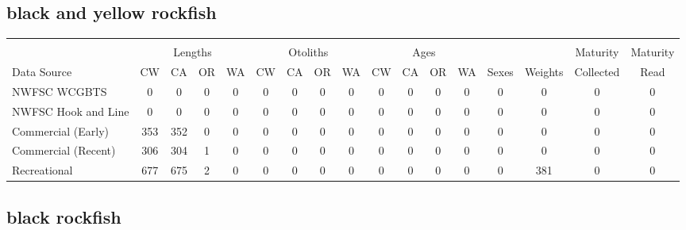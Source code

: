 \documentclass[12pt,]{article}
\begin{document}
\FloatBarrier  

\subsection{black and yellow rockfish}\label{black-and-yellow-rockfish}

\begin{table}[ht]
\centering
\begingroup\fontsize{10pt}{10pt}\selectfont
\begin{tabular}{|l|cccc|cccc|cccc|c|c|c|c|}
  \hline
 &  &  &  &  &  &  &  &  &  &  &  &  &  &  &  &  \\ 
   & \multicolumn{4}{c}{Lengths} &  \multicolumn{4}{c}{Otoliths} & \multicolumn{4}{c}{Ages} &  & & Maturity & Maturity\\
 Data Source & CW & CA & OR & WA & CW & CA & OR & WA & CW & CA & OR & WA & Sexes & Weights & Collected & Read\\
 \hline
NWFSC WCGBTS & 0 & 0 & 0 & 0 & 0 & 0 & 0 & 0 & 0 & 0 & 0 & 0 & 0 & 0 & 0 & 0 \\ 
  NWFSC Hook and Line & 0 & 0 & 0 & 0 & 0 & 0 & 0 & 0 & 0 & 0 & 0 & 0 & 0 & 0 & 0 & 0 \\ 
  Commercial (Early) & 353 & 352 & 0 & 0 & 0 & 0 & 0 & 0 & 0 & 0 & 0 & 0 & 0 & 0 & 0 & 0 \\ 
  Commercial (Recent) & 306 & 304 & 1 & 0 & 0 & 0 & 0 & 0 & 0 & 0 & 0 & 0 & 0 & 0 & 0 & 0 \\ 
  Recreational & 677 & 675 & 2 & 0 & 0 & 0 & 0 & 0 & 0 & 0 & 0 & 0 & 0 & 381 & 0 & 0 \\ 
   \hline
\end{tabular}
\endgroup
\end{table}

\FloatBarrier  

\subsection{black rockfish}\label{black-rockfish}
\end{document}
